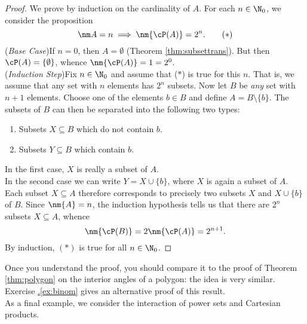 \begin{proof}
We prove by induction on the cardinality of $A$. For each $n\in\N_0$, we consider the proposition
\[\nm A=n\implies\nm{\cP(A)}=2^n.\tag*{($\ast$)}\]
(\emph{Base Case})\quad If $n=0$, then $A=\emptyset$ (Theorem \hyperlink{thm:subsettranslnk}{\ref*{thm:subsettrans}}). But then $\cP(A)=\{\emptyset\}$, whence $\nm{\cP(A)}=1=2^0$.\\
(\emph{Induction Step})\quad Fix $n\in\N_0$ and assume that ($\ast$) is true for this $n$. That is, we assume that any set with $n$ elements has $2^n$ subsets. Now let $B$ be \emph{any} set with $n+1$ elements. Choose one of the elements $b\in B$ and define $A=B\setminus\{b\}$. The subsets of $B$ can then be separated into the following two types:
\begin{enumerate}\itemsep0pt
  \item Subsets $X\subseteq B$ which do not contain $b$.
  \item Subsets $Y\subseteq B$ which contain $b$.
\end{enumerate}
In the first case, $X$ is really a subset of $A$.\\
In the second case we can write $Y=X\cup\{b\}$, where $X$ is again a subset of $A$.\\
Each subset $X\subseteq A$ therefore corresponds to precisely two subsets $X$ and $X\cup\{b\}$ of $B$. Since $\nm{A}=n$, the induction hypothesis tells us that there are $2^n$ subsets $X\subseteq A$, whence
\[\nm{\cP(B)}=2\nm{\cP(A)}=2^{n+1}.\]
By induction, $(\ast)$ is true for all $n\in\N_0$.
\end{proof}

\noindent Once you understand the proof, you should compare it to the proof of Theorem \ref{thm:polygon} on the interior angles of a polygon: the idea is very similar. Exercise \hyperref[ex:binom]{\thesubsection.\ref*{ex:binom}} gives an alternative proof of this result.\\

\noindent As a final example, we consider the interaction of power sets and Cartesian products.


